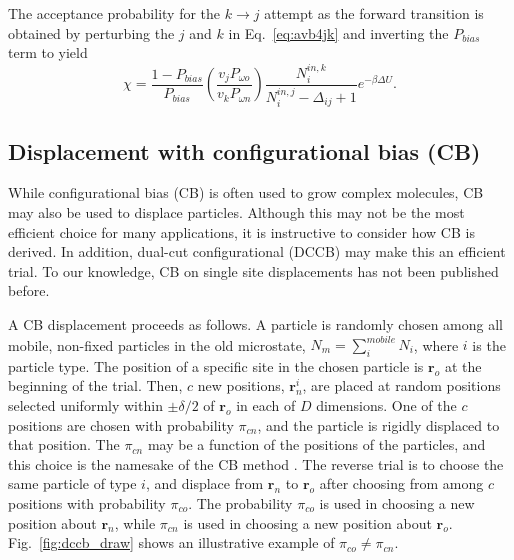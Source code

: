 \documentclass[
  9pt,
  bestpractices,
]{livecoms}
\begin{document}
The acceptance probability for the $k\rightarrow j$ attempt as the forward transition is obtained by perturbing the $j$ and $k$ in Eq.~\ref{eq:avb4jk} and inverting the $P_{bias}$ term to yield
\begin{equation}
\chi = \frac{1-P_{bias}}{P_{bias}}\left(\frac{v_j P_{\omega o}}{v_k P_{\omega n}}\right)\frac{N_i^{in,k}}{N_i^{in,j} - \Delta_{ij} + 1}e^{-\beta \Delta U}.
\label{eq:avb3inin}
\end{equation}


\subsection{\label{sec:lhs_disp_cb}Displacement with configurational bias (CB)}

While configurational bias (CB) is often used to grow complex molecules, CB may also be used to displace particles.
Although this may not be the most efficient choice for many applications, it is instructive to consider how CB is derived.
In addition, dual-cut configurational (DCCB) \cite{vlugt_improving_1998} may make this an efficient trial.
To our knowledge, CB on single site displacements has not been published before.

A CB displacement proceeds as follows.
A particle is randomly chosen among all mobile, non-fixed particles in the old microstate, $N_m=\sum_i^{mobile} N_i$, where $i$ is the particle type.
The position of a specific site in the chosen particle is $\mathbf{r}_o$ at the beginning of the trial.
Then, $c$ new positions, $\mathbf{r}_n^i$, are placed at random positions selected uniformly within $\pm\delta/2$ of $\mathbf{r}_o$ in each of $D$ dimensions.
One of the $c$ positions are chosen with probability $\pi_{cn}$, and the particle is rigidly displaced to that position.
The $\pi_{cn}$ may be a function of the positions of the particles, and this choice is the namesake of the CB method \cite{siepmann_configurational_1992}.
The reverse trial is to choose the same particle of type $i$, and displace from $\mathbf{r}_n$ to $\mathbf{r}_o$ after choosing from among $c$ positions with probability $\pi_{co}$.
The probability $\pi_{co}$ is used in choosing a new position about $\mathbf{r}_n$, while $\pi_{cn}$ is used in choosing a new position about $\mathbf{r}_o$.
Fig.~\ref{fig:dccb_draw} shows an illustrative example of $\pi_{co} \neq \pi_{cn}$.
\end{document}
